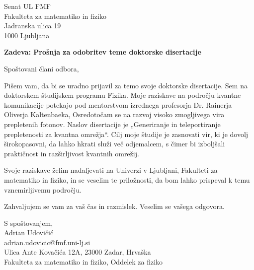 \documentclass{article}
\theoremstyle{mytheoremstyle}
\theoremstyle{mytheoremstyle}
\theoremstyle{myproblemstyle}
\begin{document}
\noindent Senat UL FMF\\
    Fakulteta za matematiko in fiziko\\
    Jadranska ulica 19\\
    1000 Ljubljana\\

\vspace{.5cm}

\begin{center}
    \textbf{Zadeva: Prošnja za odobritev teme doktorske disertacije}
\end{center}
\vspace{.5cm}

Spoštovani člani odbora,
\vspace{1cm}

Pišem vam, da bi se uradno prijavil za temo svoje doktorske disertacije. Sem na doktorskem študijskem programu Fizika.
Moje raziskave na področju kvantne komunikacije potekajo pod mentorstvom izrednega profesorja Dr. Rainerja Oliverja Kaltenbaeka,
Osredotočam se na razvoj visoko zmogljivega vira prepletenih fotonov. Naslov disertacije je „Generiranje in teleportiranje prepletenosti za kvantna omrežja“. 
Cilj moje študije je zasnovati vir, ki je dovolj širokopasovni, da lahko hkrati služi več odjemalcem,
s čimer bi izboljšali praktičnost in razširljivost kvantnih omrežij.

Svoje raziskave želim nadaljevati na Univerzi v Ljubljani,
Fakulteti za matematiko in fiziko, in se veselim te priložnosti,
da bom lahko prispeval k temu vznemirljivemu področju.

Zahvaljujem se vam za vaš čas in razmislek. Veselim se vašega odgovora.



\vspace{1cm}
S spoštovanjem,\\
Adrian Udovičić\\
adrian.udovicic@fmf.uni-lj.si\\
Ulica Ante Kovačića 12A, 23000 Zadar, Hrvaška\\
Fakulteta za matematiko in fiziko, Oddelek za fiziko


\clearpage
\pagestyle{plain}

\vspace{1cm}
\end{document}

